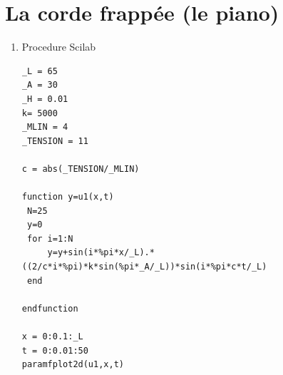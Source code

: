 \documentclass[a4paper,12pt]{report}
\begin{document}
\section{La corde frapp\'ee (le piano)}
\begin{enumerate}
\item Procedure Scilab

\begin{lstlisting}
_L = 65
_A = 30 
_H = 0.01
k= 5000
_MLIN = 4
_TENSION = 11 

c = abs(_TENSION/_MLIN)

function y=u1(x,t)
 N=25
 y=0
 for i=1:N
     y=y+sin(i*%pi*x/_L).*((2/c*i*%pi)*k*sin(%pi*_A/_L))*sin(i*%pi*c*t/_L)
 end 
   
endfunction

x = 0:0.1:_L
t = 0:0.01:50
paramfplot2d(u1,x,t)
\end{lstlisting}



\end{enumerate}
\end{document}
